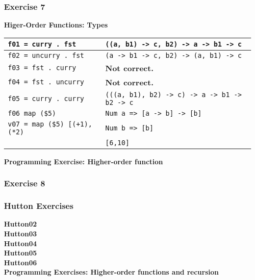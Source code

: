 \subsubsection{Exercise 7}

\textbf{Higer-Order Functions: Types}\\
\begin{tabularx}{\linewidth}{|X|X|}
  \hline
  \lstinline|f01 = curry . fst| & \lstinline|((a, b1) -> c, b2) -> a -> b1 -> c|\\
  \hline
  \lstinline|f02 = uncurry . fst| & \lstinline|(a -> b1 -> c, b2) -> (a, b1) -> c|\\
  \hline
  \lstinline|f03 = fst . curry| & \textbf{Not correct.}\\
  \hline
  \lstinline|f04 = fst . uncurry| & \textbf{Not correct.}\\
  \hline
  \lstinline|f05 = curry . curry| & \lstinline|(((a, b1), b2) -> c) -> a -> b1 -> b2 -> c|\\
  \hline
  \lstinline|f06 map ($5)| & \lstinline|Num a => [a -> b] -> [b]|\\
  \hline
  \lstinline|v07 = map ($5) [(+1), (*2)| & \lstinline|Num b => [b]|\\
   & \lstinline|[6,10]|\\
  \hline
\end{tabularx}

\textbf{Programming Exercise: Higher-order function}\\

\newpage

\subsubsection{Exercise 8}


\subsubsection{Hutton Exercises}
\textbf{Hutton02}\\

\textbf{Hutton03}\\

\textbf{Hutton04}\\

\textbf{Hutton05}\\

\textbf{Hutton06}\\


\textbf{Programming Exercises: Higher-order functions and recursion}\\


